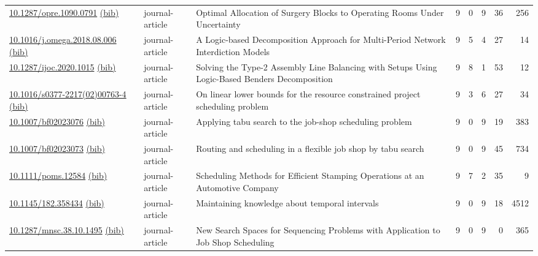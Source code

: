 {\begin{longtable}{p{5cm}lp{11cm}rrrrr}
\href{http://dx.doi.org/10.1287/opre.1090.0791}{10.1287/opre.1090.0791} \href{https://www.doi2bib.org/bib/10.1287/opre.1090.0791}{(bib)} & journal-article & Optimal Allocation of Surgery Blocks to Operating Rooms Under Uncertainty & 9 & 0 & 9 & 36 & 256 \\
\href{http://dx.doi.org/10.1016/j.omega.2018.08.006}{10.1016/j.omega.2018.08.006} \href{https://www.doi2bib.org/bib/10.1016/j.omega.2018.08.006}{(bib)} & journal-article & A Logic-based Decomposition Approach for Multi-Period Network Interdiction Models & 9 & 5 & 4 & 27 & 14 \\
\href{http://dx.doi.org/10.1287/ijoc.2020.1015}{10.1287/ijoc.2020.1015} \href{https://www.doi2bib.org/bib/10.1287/ijoc.2020.1015}{(bib)} & journal-article & Solving the Type-2 Assembly Line Balancing with Setups Using Logic-Based Benders Decomposition & 9 & 8 & 1 & 53 & 12 \\
\href{http://dx.doi.org/10.1016/s0377-2217(02)00763-4}{10.1016/s0377-2217(02)00763-4} \href{https://www.doi2bib.org/bib/10.1016/s0377-2217(02)00763-4}{(bib)} & journal-article & On linear lower bounds for the resource constrained project scheduling problem & 9 & 3 & 6 & 27 & 34 \\
\href{http://dx.doi.org/10.1007/bf02023076}{10.1007/bf02023076} \href{https://www.doi2bib.org/bib/10.1007/bf02023076}{(bib)} & journal-article & Applying tabu search to the job-shop scheduling problem & 9 & 0 & 9 & 19 & 383 \\
\href{http://dx.doi.org/10.1007/bf02023073}{10.1007/bf02023073} \href{https://www.doi2bib.org/bib/10.1007/bf02023073}{(bib)} & journal-article & Routing and scheduling in a flexible job shop by tabu search & 9 & 0 & 9 & 45 & 734 \\
\href{http://dx.doi.org/10.1111/poms.12584}{10.1111/poms.12584} \href{https://www.doi2bib.org/bib/10.1111/poms.12584}{(bib)} & journal-article & Scheduling Methods for Efficient Stamping Operations at an Automotive Company & 9 & 7 & 2 & 35 & 9 \\
\href{http://dx.doi.org/10.1145/182.358434}{10.1145/182.358434} \href{https://www.doi2bib.org/bib/10.1145/182.358434}{(bib)} & journal-article & Maintaining knowledge about temporal intervals & 9 & 0 & 9 & 18 & 4512 \\
\href{http://dx.doi.org/10.1287/mnsc.38.10.1495}{10.1287/mnsc.38.10.1495} \href{https://www.doi2bib.org/bib/10.1287/mnsc.38.10.1495}{(bib)} & journal-article & New Search Spaces for Sequencing Problems with Application to Job Shop Scheduling & 9 & 0 & 9 & 0 & 365 \\

\end{longtable}}
